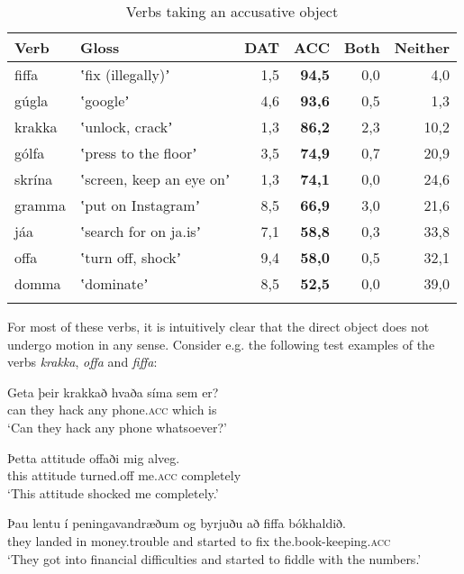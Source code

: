 \documentclass[output=paper,modfonts,nonflat,colorlinks,citecolor=brown]{langsci/langscibook}
\begin{document}
\begin{table}
{\caption{\label{tab:jonsson:3}Verbs taking an accusative object} }
\begin{tabularx}{\textwidth}{Xlrrrr}
\lsptoprule
Verb & Gloss & DAT & \textbf{ACC} & Both & Neither\\
\midrule
fiffa & ʽfix (illegally)ʼ & 1,5 & \textbf{94,5} & 0,0 & 4,0\\
gúgla & ʽgoogleʼ & 4,6 & \textbf{93,6} & 0,5 & 1,3\\
krakka & ʽunlock, crackʼ & 1,3 & \textbf{86,2} & 2,3 & 10,2\\
gólfa & ʽpress to the floorʼ & 3,5 & \textbf{74,9} & 0,7 & 20,9\\
skrína & ʽscreen, keep an eye onʼ & 1,3 & \textbf{74,1} & 0,0 & 24,6\\
gramma & ʽput on Instagramʼ & 8,5 & \textbf{66,9} & 3,0 & 21,6\\
jáa & ʽsearch for on ja.isʼ & 7,1 & \textbf{58,8} & 0,3 & 33,8\\
offa & ʽturn off, shockʼ & 9,4 & \textbf{58,0} & 0,5 & 32,1\\
domma & ʽdominateʼ & 8,5 & \textbf{52,5} & 0,0 & 39,0\\
\lspbottomrule
\end{tabularx}
\end{table}

For most of these verbs, it is intuitively clear that the direct object does not undergo motion in any sense. Consider e.g. the following test examples of the verbs \textit{krakka}, \textit{offa} and \textit{fiffa}:


\ea%
    \label{ex:jonsson:5}
\ea
\gll  Geta  þeir  krakkað  hvaða  síma  sem  er?\\
   can  they  hack  any  phone.\textsc{acc}  which  is\\
\glt `Can they hack any phone whatsoever?'

\ex
\gll   Þetta  attitude  offaði  mig   alveg.\\
 this  attitude  turned.off  me.\textsc{acc}   completely\\
   \glt`This attitude shocked me completely.'


\ex
\gll   Þau  lentu  í  peningavandræðum  og  byrjuðu  að  fiffa  bókhaldið.\\
 they  landed  in  money.trouble  and  started  to  fix  the.book-keeping.\textsc{acc}\\
\glt `They got into financial difficulties and started to fiddle with the numbers.'
\z
\z
\end{document}
